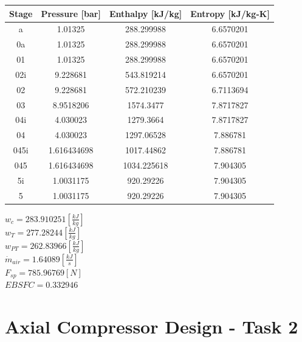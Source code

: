 \documentclass[titlepage]{article}
\begin{document}
    \begin{center}
        \begin{tabular}{|c|c|c|c|}
            \hline
            Stage & Pressure [bar] & Enthalpy [kJ/kg] & Entropy [kJ/kg-K]\\
            \hline
             a & 1.01325 & 288.299988 & 6.6570201 \\
            \hline
            0a & 1.01325 & 288.299988 & 6.6570201 \\
            \hline
            01 & 1.01325 & 288.299988 & 6.6570201 \\
            \hline
            02i & 9.228681 & 543.819214 & 6.6570201 \\
            \hline
            02 & 9.228681 & 572.210239 & 6.7113694 \\
            \hline
            03 & 8.9518206 & 1574.3477 & 7.8717827 \\
            \hline
            04i & 4.030023 & 1279.3664 & 7.8717827 \\
            \hline
            04 & 4.030023 & 1297.06528 & 7.886781 \\
            \hline
            045i & 1.616434698 & 1017.44862 & 7.886781 \\
            \hline
            045 & 1.616434698 & 1034.225618 & 7.904305 \\
            \hline
            5i & 1.0031175 & 920.29226 & 7.904305 \\
            \hline
            5 & 1.0031175 & 920.29226 & 7.904305 \\
            \hline
        \end{tabular}
    \end{center}

    \begin{center}
        $w_{c} = 283.910251 [\frac{kJ}{kg}]$ \\
        $w_{T} = 277.28244 [\frac{kJ}{kg}]$ \\
        $w_{PT} = 262.83966 [\frac{kJ}{kg}]$ \\
        $\dot{m}_{air} = 1.64089 [\frac{kJ}{s}]$ \\
        $F_{sp} = 785.96769 [N]$ \\
        $EBSFC = 0.332946$ \\
    \end{center}

    \vspace{9cm}

    \section{Axial Compressor Design - Task 2}
\end{document}
